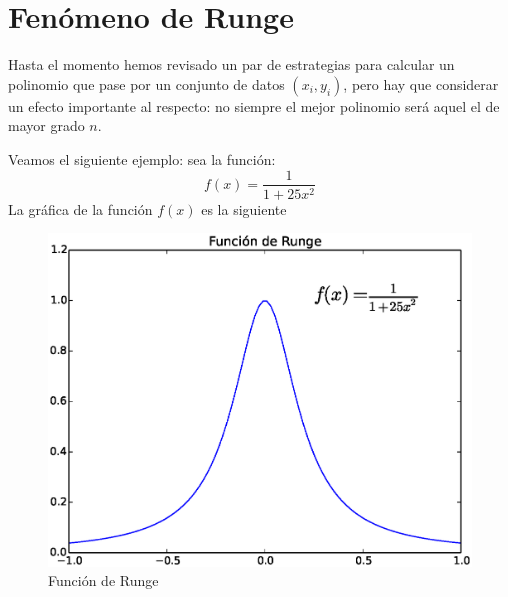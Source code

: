 \section{Fenómeno de Runge}
Hasta el momento hemos revisado un par de estrategias para calcular un polinomio que pase por un conjunto de datos $(x_{i}, y_{i})$, pero hay que considerar un efecto importante al respecto: no siempre el mejor polinomio será aquel el de mayor grado $n$.
\par
Veamos el siguiente ejemplo: sea la función:
\[ f(x) = \dfrac{1}{1 + 25 x^{2}}\]
La gráfica de la función $f(x)$ es la siguiente
\begin{figure}[H]
	\centering
	\includegraphics[scale=0.8]{Imagenes/Funcion_Runge_01.eps}
	\caption{Función de Runge}
\end{figure}

